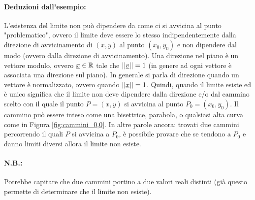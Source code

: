 
\paragraph{Deduzioni dall'esempio:} L'esistenza del limite non può dipendere da come ci si avvicina al punto "problematico", ovvero il limite deve essere lo stesso indipendentemente dalla direzione di avvicinamento di $(x,y)$ al punto $(x_0, y_0)$ e non dipendere dal modo (ovvero dalla direzione di avvicinamento). Una direzione nel piano è un vettore modulo, ovvero $\uline x\in\mathbb R$ tale che $||\uline v||=1$ (in genere ad ogni vettore è associata una direzione sul piano).  In generale si parla di direzione quando un vettore è normalizzato, ovvero quando $||\uline x||=1$. Quindi, quando il limite esiste ed è unico significa che il limite non deve dipendere dalla direzione e/o dal cammino scelto con il quale il punto $P=(x,y)$ si avvicina al punto $P_0=(x_0,y_0)$.  Il cammino può essere inteso come una bisettrice, parabola, o qualsiasi alta curva come in Figura \ref{fig:cammini_0,0}. In altre parole ancora: trovati due cammini percorrendo il quali $P$ si avvicina a $P_0$, è possibile provare che se tendono a $P_0$ e danno limiti diversi allora il limite non esiste.

\paragraph{N.B.:} Potrebbe capitare che due cammini portino a due valori reali distinti (già questo permette di determinare che il limite non esiste).

